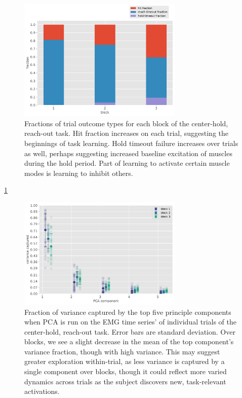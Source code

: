 \documentclass[
  a4paper,
]{article}
\begin{document}
\begin{figure}
\hypertarget{fig:hit_fraction}{%
\centering
\includegraphics[width=0.7\textwidth,height=\textheight]{images/data_analysis/center_hold/hit_fraction.pdf}
\caption{Fractions of trial outcome types for each block of the
center-hold, reach-out task. Hit fraction increases on each trial,
suggesting the beginnings of task learning. Hold timeout failure
increases over trials as well, perhaps suggesting increased baseline
excitation of muscles during the hold period. Part of learning to
activate certain muscle modes is learning to inhibit
others.}\label{fig:hit_fraction}
}
\end{figure}

\cref{fig:hit_fraction}

\begin{figure}
\hypertarget{fig:PCA_trial_variance}{%
\centering
\includegraphics[width=0.7\textwidth,height=\textheight]{images/data_analysis/center_hold/PCA_trial_variance.pdf}
\caption{Fraction of variance captured by the top five principle
components when PCA is run on the EMG time series' of individual trials
of the center-hold, reach-out task. Error bars are standard deviation.
Over blocks, we see a slight decrease in the mean of the top component's
variance fraction, though with high variance. This may suggest greater
exploration within-trial, as less variance is captured by a single
component over blocks, though it could reflect more varied dynamics
across trials as the subject discovers new, task-relevant
activations.}\label{fig:PCA_trial_variance}
}
\end{figure}
\end{document}
